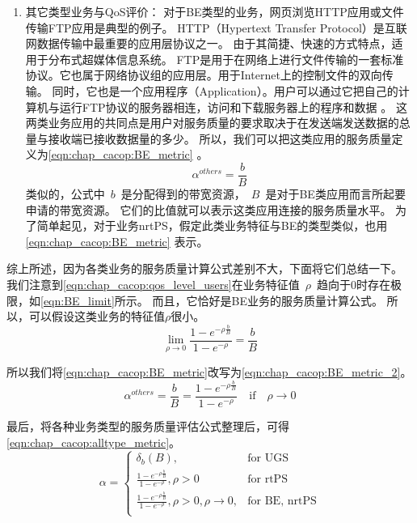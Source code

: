 \begin{enumerate}[(1)]
\item 其它类型业务与QoS评价：
对于BE类型的业务，网页浏览HTTP应用或文件传输FTP应用是典型的例子。
HTTP（Hypertext Transfer Protocol）是互联网数据传输中最重要的应用层协议之一\cite{Fielding_1999}。 
由于其简捷、快速的方式特点，适用于分布式超媒体信息系统。
FTP是用于在网络上进行文件传输的一套标准协议。它也属于网络协议组的应用层。用于Internet上的控制文件的双向传输。
同时，它也是一个应用程序（Application）。用户可以通过它把自己的计算机与运行FTP协议的服务器相连，访问和下载服务器上的程序和数据 \cite{Postel_Reynolds_1985}。
这两类业务应用的共同点是用户对服务质量的要求取决于在发送端发送数据的总量与接收端已接收数据量的多少。
所以，我们可以把这类应用的服务质量定义为\eqref{eqn:chap_cacop:BE_metric} 。
%
\begin{equation}
\label{eqn:chap_cacop:BE_metric}
\alpha^{others} = \frac{b}{B}
\end{equation}
%
类似的，公式中~$b$~是分配得到的带宽资源，~$B$~是对于BE类应用而言所起要申请的带宽资源。
它们的比值就可以表示这类应用连接的服务质量水平。
为了简单起见，对于业务nrtPS，假定此类业务特征与BE的类型类似，也用 \eqref{eqn:chap_cacop:BE_metric} 表示。
\end{enumerate}

综上所述，因为各类业务的服务质量计算公式差别不大，下面将它们总结一下。
我们注意到\eqref{eqn:chap_cacop:qos_level_users}在业务特征值~$\rho$~趋向于$0$时存在极限，如\eqref{eqn:BE_limit}所示。
而且，它恰好是BE业务的服务质量计算公式。 所以，可以假设这类业务的特征值$\rho$很小。
%
\begin{equation}
\label{eqn:BE_limit}
\lim\limits_{\rho \to 0 } \frac{1- e^{-\rho \frac{b}{B} }}{1-e^{-\rho}} = \frac{b}{B}
\end{equation}

所以我们将\eqref{eqn:chap_cacop:BE_metric}改写为\eqref{eqn:chap_cacop:BE_metric_2}。
%
\begin{equation}
\label{eqn:chap_cacop:BE_metric_2}
\alpha^{others} = \frac{b}{B} = \frac{1- e^{-\rho \frac{b}{B} }}{1-e^{-\rho}} \quad \text{if} \quad \rho \to 0
\end{equation}
%

最后，将各种业务类型的服务质量评估公式整理后，可得\eqref{eqn:chap_cacop:alltype_metric}。
%
\begin{equation}
\alpha = 
\begin{cases}
\delta_{b}(B), &\text{for UGS} \\
\frac{1- e^{-\rho \frac{b}{B} }}{1-e^{-\rho}}, \rho > 0& \text{for rtPS }\\
\frac{1- e^{-\rho \frac{b}{B} }}{1-e^{-\rho}}, \rho>0, \rho \to 0, &\text{for BE, nrtPS}\\
\end{cases}
\label{eqn:chap_cacop:alltype_metric}
\end{equation}

